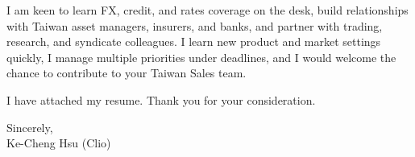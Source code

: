 \documentclass[11pt,letterpaper]{article}
\begin{document}
I am keen to learn FX, credit, and rates coverage on the desk, build relationships with Taiwan asset managers, insurers, and banks, and partner with trading, research, and syndicate colleagues. I learn new product and market settings quickly, I manage multiple priorities under deadlines, and I would welcome the chance to contribute to your Taiwan Sales team.

I have attached my resume. Thank you for your consideration.

\vspace{0.4em}
Sincerely,\\[0.8em]
Ke-Cheng Hsu (Clio)
\end{document}
